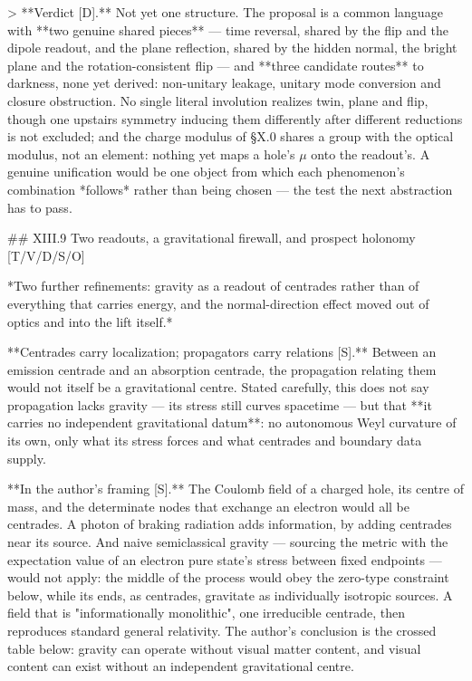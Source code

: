 > **Verdict [D].** Not yet one structure. The proposal is a common language with **two genuine shared pieces** — time reversal, shared by the flip and the dipole readout, and the plane reflection, shared by the hidden normal, the bright plane and the rotation-consistent flip — and **three candidate routes** to darkness, none yet derived: non-unitary leakage, unitary mode conversion and closure obstruction. No single literal involution realizes twin, plane and flip, though one upstairs symmetry inducing them differently after different reductions is not excluded; and the charge modulus of §X.0 shares a group with the optical modulus, not an element: nothing yet maps a hole's $\mu$ onto the readout's. A genuine unification would be one object from which each phenomenon's combination *follows* rather than being chosen — the test the next abstraction has to pass.

## XIII.9 Two readouts, a gravitational firewall, and prospect holonomy [T/V/D/S/O]

*Two further refinements: gravity as a readout of centrades rather than of everything that carries energy, and the normal-direction effect moved out of optics and into the lift itself.*

**Centrades carry localization; propagators carry relations [S].** Between an emission centrade and an absorption centrade, the propagation relating them would not itself be a gravitational centre. Stated carefully, this does not say propagation lacks gravity — its stress still curves spacetime — but that **it carries no independent gravitational datum**: no autonomous Weyl curvature of its own, only what its stress forces and what centrades and boundary data supply.

**In the author's framing [S].** The Coulomb field of a charged hole, its centre of mass, and the determinate nodes that exchange an electron would all be centrades. A photon of braking radiation adds information, by adding centrades near its source. And naive semiclassical gravity — sourcing the metric with the expectation value of an electron pure state's stress between fixed endpoints — would not apply: the middle of the process would obey the zero-type constraint below, while its ends, as centrades, gravitate as individually isotropic sources. A field that is "informationally monolithic", one irreducible centrade, then reproduces standard general relativity. The author's conclusion is the crossed table below: gravity can operate without visual matter content, and visual content can exist without an independent gravitational centre.

